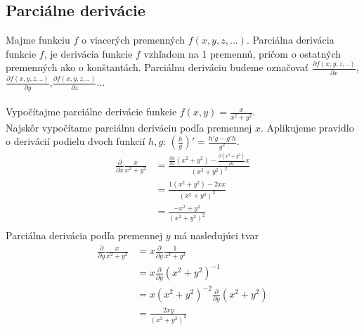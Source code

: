 \documentclass[../main.tex]{subfiles}
\begin{document}
\subsection{Parciálne derivácie}
Majme funkciu $f$ o viacerých premenných $f(x,y,z, ...)$. Parciálna derivácia funkcie $f$, je derivácia funkcie $f$ vzhľadom na 1 premennú, pričom o ostatných premenných ako o konštantách. Parciálnu deriváciu budeme označovať $\frac{\partial f(x,y,z,..)}{\partial x}$,$\frac{\partial f(x,y,z,..)}{\partial y}$,$\frac{\partial f(x,y,z,..)}{\partial z}$...\\\\
Vypočítajme parciálne derivácie funkcie $f(x,y)= \frac{x}{x^2+y^2}$.\\
Najskôr vypočítame parciálnu deriváciu podľa premennej $x$. Aplikujeme pravidlo o derivácií podielu dvoch funkcií $h,g$: $(\frac{h}{g})'= \frac{h'g-g'h}{g^2}$.
\begin{equation}
	\begin{split}
	\frac{\partial}{\partial x}\frac{x}{x^2+y^2} &= \frac{\frac{\partial x}{\partial x}(x^2+y^2)-\frac{\partial (x^2+y^2)}{\partial x}x}{(x^2+y^2)^2} \\
	&= \frac{1(x^2+y^2)-2xx}{(x^2+y^2)^2}\\
	&= \frac{-x^2+y^2}{(x^2+y^2)^2}\\
	\end{split}
	\label{eqn:PDx}
\end{equation}
Parciálna derivácia podľa premennej $y$ má nasledujúci tvar 
\begin{equation}
	\begin{split}
	\frac{\partial}{\partial y}\frac{x}{x^2+y^2} &= x\frac{\partial}{\partial y}\frac{1}{x^2+y^2} \\
	&= x\frac{\partial}{\partial y}(x^2+y^2)^{-1} \\
	&= x(x^2+y^2)^{-2}\frac{\partial}{\partial y}(x^2+y^2) \\
	&= \frac{2xy}{(x^2+y^2)^{2}} \\
	\end{split}
	\label{eqn:PDy}
\end{equation}
\end{document}
